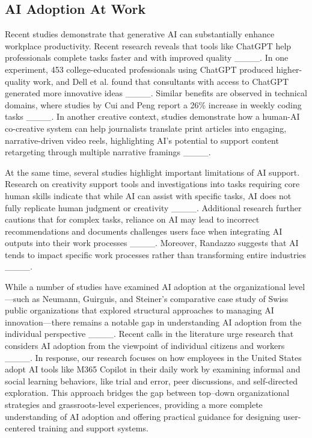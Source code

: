 
\subsection{AI Adoption At Work}
Recent studies demonstrate that generative AI can substantially enhance workplace productivity. Recent research reveals that tools like ChatGPT help professionals complete tasks faster and with improved quality ____. In one experiment, 453 college-educated professionals using ChatGPT produced higher-quality work, and Dell et al. found that consultants with access to ChatGPT generated more innovative ideas ____. Similar benefits are observed in technical domains, where studies by Cui and Peng report a 26\% increase in weekly coding tasks ____. In another creative context, studies demonstrate how a human-AI co-creative system can help journalists translate print articles into engaging, narrative-driven video reels, highlighting AI’s potential to support content retargeting through multiple narrative framings ____.

At the same time, several studies highlight important limitations of AI support. Research on creativity support tools and investigations into tasks requiring core human skills indicate that while AI can assist with specific tasks, AI does not fully replicate human judgment or creativity ____. Additional research further cautions that for complex tasks, reliance on AI may lead to incorrect recommendations and documents challenges users face when integrating AI outputs into their work processes ____. Moreover, Randazzo suggests that AI tends to impact specific work processes rather than transforming entire industries ____.

While a number of studies have examined AI adoption at the organizational level—such as Neumann, Guirguis, and Steiner’s comparative case study of Swiss public organizations that explored structural approaches to managing AI innovation—there remains a notable gap in understanding AI adoption from the individual perspective ____. Recent calls in the literature urge research that considers AI adoption from the viewpoint of individual citizens and workers ____. In response, our research focuses on how employees in the United States adopt AI tools like M365 Copilot in their daily work by examining informal and social learning behaviors, like trial and error, peer discussions, and self-directed exploration. This approach bridges the gap between top–down organizational strategies and grassroots-level experiences, providing a more complete understanding of AI adoption and offering practical guidance for designing user-centered training and support systems.


